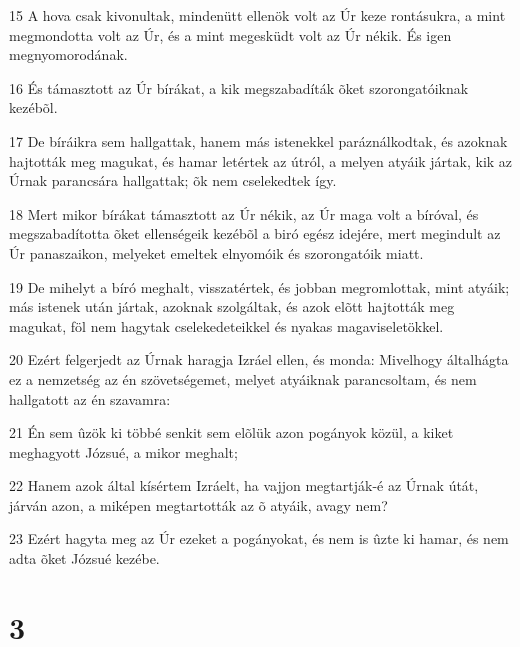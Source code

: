 \par 15 A hova csak kivonultak, mindenütt ellenök volt az Úr keze rontásukra, a mint megmondotta volt az Úr, és a mint megesküdt volt az Úr nékik. És igen megnyomorodának.
\par 16 És támasztott az Úr bírákat, a kik megszabadíták õket szorongatóiknak kezébõl.
\par 17 De bíráikra sem hallgattak, hanem más istenekkel paráználkodtak, és azoknak hajtották meg magukat, és hamar letértek az útról, a melyen atyáik jártak, kik az Úrnak parancsára hallgattak; õk nem cselekedtek így.
\par 18 Mert mikor bírákat támasztott az Úr nékik, az Úr maga volt a bíróval, és megszabadította õket ellenségeik kezébõl a biró egész idejére, mert megindult az Úr panaszaikon, melyeket emeltek elnyomóik és szorongatóik miatt.
\par 19 De mihelyt a bíró meghalt, visszatértek, és jobban megromlottak, mint atyáik; más istenek után jártak, azoknak szolgáltak, és azok elõtt hajtották meg magukat, föl nem hagytak cselekedeteikkel és nyakas magaviseletökkel.
\par 20 Ezért felgerjedt az Úrnak haragja Izráel ellen, és monda: Mivelhogy általhágta ez a nemzetség az én szövetségemet, melyet atyáiknak parancsoltam, és nem hallgatott az én szavamra:
\par 21 Én sem ûzök ki többé senkit sem elõlük azon pogányok közül, a kiket meghagyott Józsué, a mikor meghalt;
\par 22 Hanem azok által kísértem Izráelt, ha vajjon megtartják-é az Úrnak útát, járván azon, a miképen megtartották az õ atyáik, avagy nem?
\par 23 Ezért hagyta meg az Úr ezeket a pogányokat, és nem is ûzte ki hamar, és nem adta õket Józsué kezébe.

\chapter{3}


